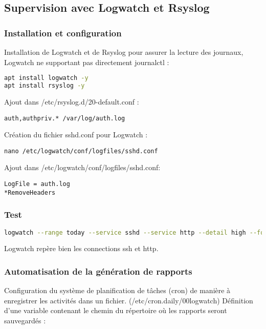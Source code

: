 \documentclass[12pt,a4paper]{article}
\begin{document}
\subsection{Supervision avec Logwatch et Rsyslog}

\subsubsection{Installation et configuration}

Installation de Logwatch et de Rsyslog pour assurer la lecture des journaux, Logwatch ne supportant pas directement journalctl :

\begin{lstlisting}[language=bash]
apt install logwatch -y
apt install rsyslog -y
\end{lstlisting}

Ajout dans /etc/rsyslog.d/20-default.conf :

\begin{lstlisting}
auth,authpriv.* /var/log/auth.log
\end{lstlisting}

Cr\'eation du fichier sshd.conf pour Logwatch :

\begin{lstlisting}
nano /etc/logwatch/conf/logfiles/sshd.conf
\end{lstlisting}

Ajout dans /etc/logwatch/conf/logfiles/sshd.conf:

\begin{lstlisting}
LogFile = auth.log
*RemoveHeaders
\end{lstlisting}

\subsubsection{Test}
\begin{lstlisting}[language=bash]
logwatch --range today --service sshd --service http --detail high --format text
\end{lstlisting}
Logwatch repère bien les connections ssh et http.


\subsubsection{Automatisation de la génération de rapports}


Configuration du système de planification de tâches (cron) de manière à enregistrer les activités dans un fichier. (/etc/cron.daily/00logwatch)
Définition d'une variable contenant le chemin du répertoire où les rapports seront sauvegardés :
\end{document}

